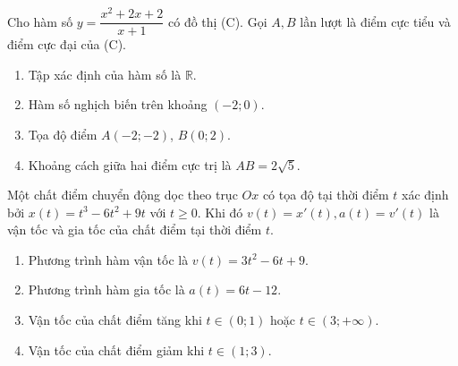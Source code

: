 \begin{baitap}
	Cho hàm số $y = \dfrac{x^2 + 2x + 2}{x + 1}$ có đồ thị (C). Gọi $A, B$ lần lượt là điểm cực tiểu và điểm cực đại của (C).
	\begin{enumerate}[\quad \bf a)]
		\item Tập xác định của hàm số là $\mathbb{R}$.
		\item Hàm số nghịch biến trên khoảng $(-2; 0)$.
		\item Tọa độ điểm $A(-2; -2)$, $B(0; 2)$.
		\item Khoảng cách giữa hai điểm cực trị là $AB = 2\sqrt{5}$.
	\end{enumerate}
\end{baitap}

\begin{baitap}
	Một chất điểm chuyển động dọc theo trục $Ox$ có tọa độ tại thời điểm $t$ xác định bởi $x(t) = t^3 - 6t^2 + 9t$ với $t \ge 0$. Khi đó $v(t)=x'(t),a(t)=v'(t)$ là vận tốc và gia tốc của chất điểm tại thời điểm $t$.
	\begin{enumerate}[\quad \bf a)]
		\item Phương trình hàm vận tốc là $v(t) = 3t^2 - 6t + 9$.
		\item Phương trình hàm gia tốc là $a(t) = 6t - 12$.
		\item Vận tốc của chất điểm tăng khi $t \in (0; 1)$ hoặc $t \in (3; +\infty)$.
		\item Vận tốc của chất điểm giảm khi $t \in (1; 3)$.
	\end{enumerate}
\end{baitap}

